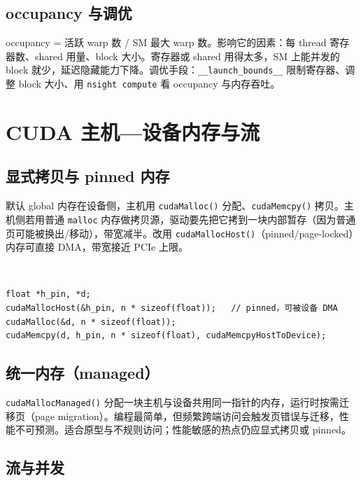 \documentclass[12pt,a4paper,fontset=fandol]{ctexbook}
\newcommand{\cudalabel}{%
  \begin{tcolorbox}[enhanced,colback=cudaheadbg,colframe=cudaheadbg,
    arc=1mm,boxrule=0mm,left=6pt,right=6pt,top=2pt,bottom=2pt,
    halign=left,oversize]
    \textcolor{white}{\small\bfseries CUDA}
  \end{tcolorbox}\vspace{-4pt}}
\newcommand{\Fn}[1]{\texttt{#1()}}
\begin{document}
\section{occupancy 与调优}\label{sec:occupancy}

occupancy = 活跃 warp 数 / SM 最大 warp 数。影响它的因素：每 thread 寄存器数、shared 用量、block 大小。寄存器或 shared 用得太多，SM 上能并发的 block 就少，延迟隐藏能力下降。调优手段：\texttt{\_\_launch\_bounds\_\_} 限制寄存器、调整 block 大小、用 \texttt{nsight compute} 看 occupancy 与内存吞吐。

\chapter{CUDA 主机—设备内存与流}\label{ch:cuda-memflow}

\section{显式拷贝与 pinned 内存}\label{sec:cuda-copy}

默认 global 内存在设备侧，主机用 \Fn{cudaMalloc} 分配、\Fn{cudaMemcpy} 拷贝。主机侧若用普通 \texttt{malloc} 内存做拷贝源，驱动要先把它拷到一块内部暂存（因为普通页可能被换出/移动），带宽减半。改用 \Fn{cudaMallocHost}（pinned/page-locked）内存可直接 DMA，带宽接近 PCIe 上限。

\cudalabel
\begin{lstlisting}[style=cudastyle]
float *h_pin, *d;
cudaMallocHost(&h_pin, n * sizeof(float));   // pinned，可被设备 DMA
cudaMalloc(&d, n * sizeof(float));
cudaMemcpy(d, h_pin, n * sizeof(float), cudaMemcpyHostToDevice);
\end{lstlisting}

\section{统一内存（managed）}\label{sec:cuda-managed}

\Fn{cudaMallocManaged} 分配一块主机与设备共用同一指针的内存，运行时按需迁移页（page migration）。编程最简单，但频繁跨端访问会触发页错误与迁移，性能不可预测。适合原型与不规则访问；性能敏感的热点仍应显式拷贝或 pinned。

\section{流与并发}\label{sec:cuda-streams}
\end{document}

